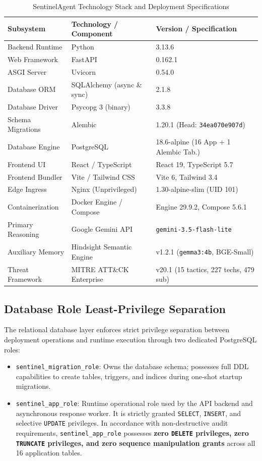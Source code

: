 \documentclass[conference]{IEEEtran}
\begin{document}
\begin{table}[t]
\caption{SentinelAgent Technology Stack and Deployment Specifications}
\label{tab:tech_stack}
\centering
\begin{tabular}{lll}
\toprule
\textbf{Subsystem} & \textbf{Technology / Component} & \textbf{Version / Specification} \\
\midrule
Backend Runtime & Python & 3.13.6 \\
Web Framework & FastAPI & 0.162.1 \\
ASGI Server & Uvicorn & 0.54.0 \\
Database ORM & SQLAlchemy (async \& sync) & 2.1.8 \\
Database Driver & Psycopg 3 (binary) & 3.3.8 \\
Schema Migrations & Alembic & 1.20.1 (Head: \texttt{34ea070e907d}) \\
Database Engine & PostgreSQL & 18.6-alpine (16 App + 1 Alembic Tab.) \\
Frontend UI & React / TypeScript & React 19, TypeScript 5.7 \\
Frontend Bundler & Vite / Tailwind CSS & Vite 6, Tailwind 3.4 \\
Edge Ingress & Nginx (Unprivileged) & 1.30-alpine-slim (UID 101) \\
Containerization & Docker Engine / Compose & Engine 29.9.2, Compose 5.6.1 \\
Primary Reasoning & Google Gemini API & \texttt{gemini-3.5-flash-lite} \\
Auxiliary Memory & Hindsight Semantic Engine & v1.2.1 (\texttt{gemma3:4b}, BGE-Small) \\
Threat Framework & MITRE ATT\&CK Enterprise & v20.1 (15 tactics, 227 techs, 479 sub) \\
\bottomrule
\end{tabular}
\end{table}

\subsection{Database Role Least-Privilege Separation}
The relational database layer enforces strict privilege separation between deployment operations and runtime execution through two dedicated PostgreSQL roles:
\begin{itemize}
    \item \texttt{sentinel\_migration\_role}: Owns the database schema; possesses full DDL capabilities to create tables, triggers, and indices during one-shot startup migrations.
    \item \texttt{sentinel\_app\_role}: Runtime operational role used by the API backend and asynchronous response worker. It is strictly granted \texttt{SELECT}, \texttt{INSERT}, and selective \texttt{UPDATE} privileges. In accordance with non-destructive audit requirements, \texttt{sentinel\_app\_role} possesses \textbf{zero \texttt{DELETE} privileges, zero \texttt{TRUNCATE} privileges, and zero sequence manipulation grants} across all 16 application tables.
\end{itemize}
\end{document}
